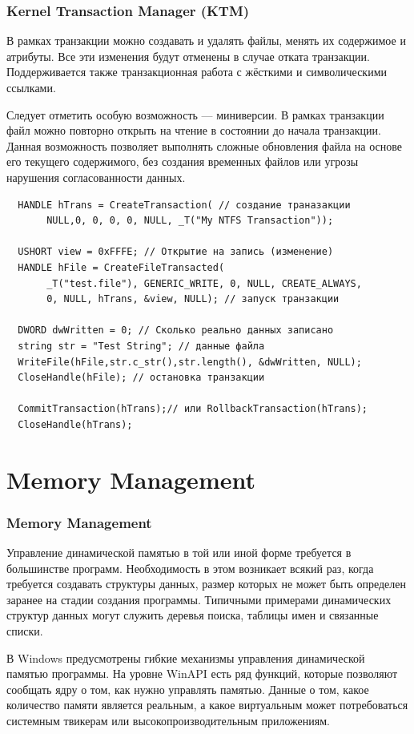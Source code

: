 \documentclass{beamer}
\begin{document}
\begin{frame}
\frametitle{Kernel Transaction Manager (KTM)}
В рамках транзакции можно создавать и удалять файлы, менять их содержимое и атрибуты. Все эти изменения будут отменены в случае отката транзакции. Поддерживается также транзакционная работа с жёсткими и символическими ссылками.
\medskip

Следует отметить особую возможность — миниверсии. В рамках транзакции файл можно повторно открыть на чтение в состоянии до начала транзакции. Данная возможность позволяет выполнять сложные обновления файла на основе его текущего содержимого, без создания временных файлов или угрозы нарушения согласованности данных.
\end{frame}


\begin{frame}[fragile]
\begin{verbatim}
  HANDLE hTrans = CreateTransaction( // создание траназакции
       NULL,0, 0, 0, 0, NULL, _T("My NTFS Transaction"));

  USHORT view = 0xFFFE; // Открытие на запись (изменение)
  HANDLE hFile = CreateFileTransacted(
       _T("test.file"), GENERIC_WRITE, 0, NULL, CREATE_ALWAYS,
       0, NULL, hTrans, &view, NULL); // запуск транзакции

  DWORD dwWritten = 0; // Сколько реально данных записано
  string str = "Test String"; // данные файла
  WriteFile(hFile,str.c_str(),str.length(), &dwWritten, NULL);
  CloseHandle(hFile); // остановка транзакции

  CommitTransaction(hTrans);// или RollbackTransaction(hTrans);
  CloseHandle(hTrans);
\end{verbatim}
\end{frame}

\section{Memory Management }

\begin{frame}
\frametitle{Memory Management }

Управление динамической памятью в той или иной форме требуется в большинстве программ. Необходимость в этом возникает всякий раз, когда требуется создавать структуры данных, размер которых не может быть определен заранее на стадии создания программы. Типичными примерами динамических структур данных могут служить деревья поиска, таблицы имен и связанные списки.
\medskip

В Windows предусмотрены гибкие механизмы управления динамической памятью программы. На уровне WinAPI есть ряд функций, которые позволяют сообщать ядру о том, как нужно управлять памятью. Данные о том, какое количество памяти является реальным, а какое виртуальным может потребоваться системным твикерам или высокопроизводительным приложениям.

\end{frame}
\end{document}
